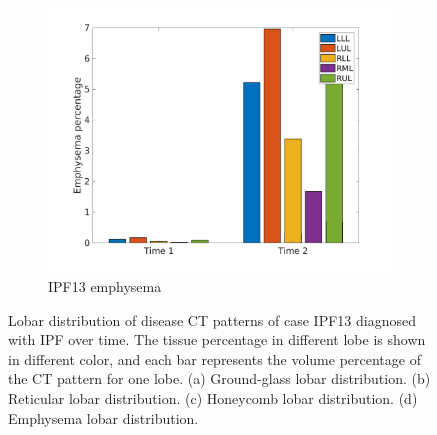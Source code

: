 \begin{figure}[H]
\begin{subfigure}{.46\linewidth}
  \includegraphics[width=\linewidth,trim={{.0\wd0} {.0\wd0} {.0\wd0} {.0\wd0}},clip]{Appendix/Image_AppexA/LobarDistribution/IPF13EmphysemaLobarRegionDiseaseDistributionOverTime.jpg}
  \caption{IPF13 emphysema}
  \label{fig:IPF13LobarRegionDiseaseDistributionOverTime-d}
\end{subfigure}
\caption{Lobar distribution of disease CT patterns of case IPF13 diagnosed with IPF over time. The tissue percentage in different lobe is shown in different color, and each bar represents the volume percentage of the CT pattern for one lobe. (a) Ground-glass lobar distribution. (b) Reticular lobar distribution. (c) Honeycomb lobar distribution. (d) Emphysema lobar distribution.}
\label{fig:IPF13LobarRegionDiseaseDistributionOverTime}
\end{figure}

